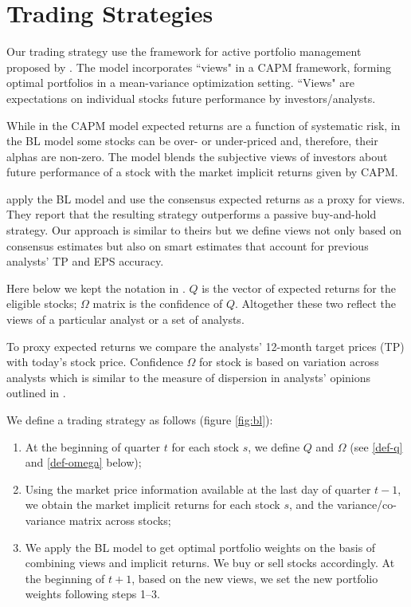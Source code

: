 \documentclass{article}
\begin{document}
\section{Trading Strategies}
\label{sec:trading}
Our trading strategy use the framework for  active portfolio management proposed by \cite{black1992}.  The model incorporates ``views" in a CAPM framework, forming optimal portfolios in a mean-variance optimization setting. ``Views" are expectations on individual stocks future performance by investors/analysts. 

While in the CAPM model expected returns are a function of systematic risk, in the BL model some stocks can be over- or under-priced and, therefore, their alphas are non-zero. The model blends the subjective views of investors about future performance of a stock with the market implicit returns given by CAPM.

\cite{da2011bl} apply the BL model and use the consensus expected returns as a proxy for views. They report that the resulting strategy outperforms a passive buy-and-hold strategy. Our approach is similar to theirs but we define views not only based on consensus estimates but also on smart estimates that account for previous analysts' TP and EPS accuracy.

Here below we kept the notation in \cite{black1992}.  $Q$ is the vector of  expected returns for the eligible stocks; $\Omega$ matrix is the confidence of $Q$. Altogether these two reflect the views of a particular analyst or a set of analysts.

To proxy expected returns we compare the analysts' 12-month target prices (TP) with today's stock price. Confidence $\Omega$ for stock is based on variation  across analysts which is similar to the measure of dispersion in analysts' opinions outlined in \cite{diether2002}.


We define a trading strategy as follows (figure \ref{fig:bl}):
\begin{enumerate}
\item  At the beginning of quarter $t$ for each stock $s$,   we define $Q$ and $\Omega$ (see \ref{def-q} and \ref{def-omega} below);

\item Using the market price information available at the last day of quarter $t-1$, we obtain the market implicit returns for each stock $s$,  and the variance/co-variance matrix across stocks;

\item We apply the BL model to get  optimal portfolio weights on the basis of combining views and implicit returns. We  buy or sell stocks accordingly. At the beginning of $t+1$, based on the new views, we set the new portfolio weights following  steps 1--3.
\end{enumerate}
\end{document}
